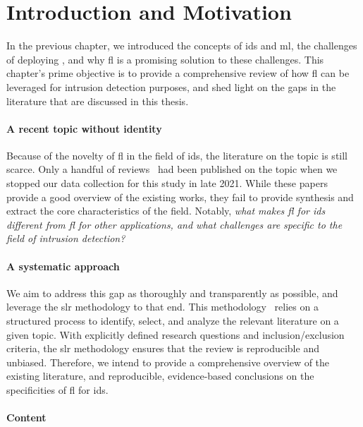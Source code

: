 \section{Introduction and Motivation\label{sec:sota.intro}}

In the previous chapter, we introduced the concepts of \acrfull{ids} and \acrfull{ml}, the challenges of deploying , and why \acrfull{fl} is a promising solution to these challenges. 
This chapter's prime objective is to provide a comprehensive review of how \gls{fl} can be leveraged for intrusion detection purposes, and shed light on the gaps in the literature that are discussed in this thesis.

\paragraph{A recent topic without identity}

Because of the novelty of \gls{fl} in the field of \gls{ids}, the literature on the topic is still scarce.
Only a handful of reviews~\cite{alazab_FederatedLearningCybersecurity_2021,agrawal_FederatedLearningintrusion_2022,campos_EvaluatingFederatedLearning_2022} had been published on the topic when we stopped our data collection for this study in late 2021.
While these papers provide a good overview of the existing works, they fail to provide synthesis and extract the core characteristics of the field.
Notably, \emph{what makes \gls{fl} for \gls{ids} different from \gls{fl} for other applications, and what challenges are specific to the field of intrusion detection?}


\paragraph{A systematic approach}

We aim to address this gap as thoroughly and transparently as possible, and leverage the \acrfull{slr} methodology to that end.
This methodology~\cite{kitchenham_Guidelinesperformingsystematic_2007} relies on a structured process to identify, select, and analyze the relevant literature on a given topic.
With explicitly defined research questions and inclusion/exclusion criteria, the \gls{slr} methodology ensures that the review is reproducible and unbiased.
Therefore, we intend to provide a comprehensive overview of the existing literature, and reproducible, evidence-based conclusions on the specificities of \gls{fl} for \gls{ids}.

\paragraph{Content}

